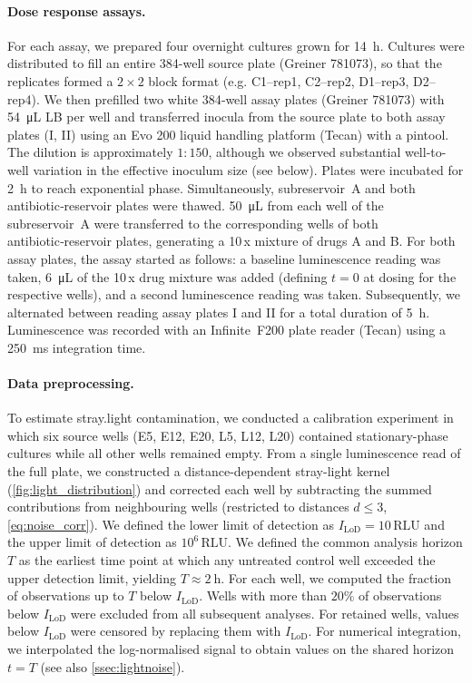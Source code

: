\paragraph{Dose response assays.}
For each assay, we prepared four overnight cultures grown for \SI{14}{\hour}.
Cultures were distributed to fill an entire 384-well source plate (Greiner 781073), so that the replicates formed a \(2\times2\) block format (e.g. C1--rep1, C2--rep2, D1--rep3, D2--rep4).
We then prefilled two white 384‑well assay plates (Greiner 781073) with \SI{54}{\micro\liter} LB per well and transferred inocula from the source plate to both assay plates (I, II) using an Evo 200 liquid handling platform (Tecan) with a pintool.
The dilution is approximately \(1{:}150\), although we observed substantial well-to-well variation in the effective inoculum size (see below).
Plates were incubated for \SI{2}{\hour} to reach exponential phase.
Simultaneously, subreservoir~A and both antibiotic‑reservoir plates were thawed.
\SI{50}{\micro\liter} from each well of the subreservoir~A were transferred to the corresponding wells of both antibiotic‑reservoir plates, generating a \num{10}\,x mixture of drugs A and B.
For both assay plates, the assay started as follows: a baseline luminescence reading was taken, \SI{6}{\micro\liter} of the \num{10}\,x drug mixture was added (defining \(t=0\) at dosing for the respective wells), and a second luminescence reading was taken.
Subsequently, we alternated between reading assay plates I and II for a total duration of \SI{5}{\hour}.
Luminescence was recorded with an Infinite~F200 plate reader (Tecan) using a \SI{250}{\milli\second} integration time.

\paragraph{Data preprocessing.}
To estimate stray.light contamination, we conducted a calibration experiment in which six source wells (E5, E12, E20, L5, L12, L20) contained stationary-phase cultures while all other wells remained empty.
From a single luminescence read of the full plate, we constructed a distance-dependent stray-light kernel (\autoref{fig:light_distribution}) and corrected each well by subtracting the summed contributions from neighbouring wells (restricted to distances $d\le 3$, \autoref{eq:noise_corr}).
We defined the lower limit of detection as \(I_{\mathrm{LoD}}=10\,\mathrm{RLU}\) and the upper limit of detection as \(10^{6}\,\mathrm{RLU}\).
We defined the common analysis horizon \(T\) as the earliest time point at which any untreated control well exceeded the upper detection limit, yielding \(T\approx\SI{2}{\hour}\).
For each well, we computed the fraction of observations up to \(T\) below \(I_{\mathrm{LoD}}\).
Wells with more than $20\%$ of observations below \(I_{\mathrm{LoD}}\) were excluded from all subsequent analyses.
For retained wells, values below \(I_{\mathrm{LoD}}\) were censored by replacing them with \(I_{\mathrm{LoD}}\).
For numerical integration, we interpolated the log-normalised signal to obtain values on the shared horizon \(t=T\) (see also \autoref{ssec:lightnoise}).


